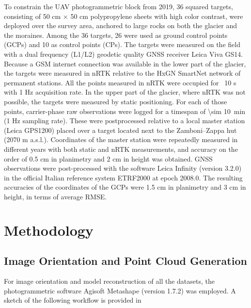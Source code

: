 To constrain the UAV photogrammetric block from 2019, 36 squared targets, consisting
of 50 cm × 50 cm polypropylene sheets with high color contrast, were deployed over the
survey area, anchored to large rocks on both the glacier and the moraines. Among the
36 targets, 26 were used as ground control points (GCPs) and 10 as control points (CPs).
The targets were measured on the field with a dual frequency (L1/L2) geodetic quality
GNSS receiver Leica Viva GS14. Because a GSM internet connection was available in the lower
part of the glacier, the targets were measured in nRTK relative to the HxGN SmartNet
network of permanent stations. All the points measured in nRTK were occupied for ~10 s
with 1 Hz acquisition rate. In the upper part of the glacier, where nRTK was not possible,
the targets were measured by static positioning. For each of those points, carrier-phase
raw observations were logged for a timespan of \SI{\sim 10}{\minute} (1 Hz sampling rate).
These were postprocessed relative to a local master station (Leica GPS1200) placed 
over a target located next to the Zamboni–Zappa hut (2070 m a.s.l.). 
Coordinates of the master station were repeatedly measured in different years with both
static and nRTK measurements, and accuracy on the order of 0.5 cm in planimetry and 2 cm 
in height was obtained. 
GNSS observations were post-processed with the software Leica Infinity (version 3.2.0) in the
official Italian reference system ETRF2000 at epoch 2008.0. The resulting accuracies of
the coordinates of the GCPs were 1.5 cm in planimetry and 3 cm in height, in terms of
average RMSE.

\section{Methodology}\label{sec:2:methods}

\subsection{Image Orientation and Point Cloud Generation}

For image orientation and model reconstruction of all the datasets, the photogrammetric software Agisoft Metashape (version 1.7.2) was employed. A sketch of the following
workflow is provided in 

